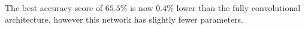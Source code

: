 The best accuracy score of $65.5\%$ is now $0.4\%$ lower than the fully
convolutional architecture, however this network has slightly fewer parameters.


